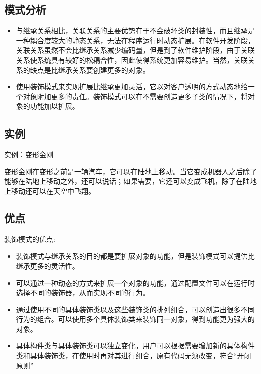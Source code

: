 \documentclass[letterpaper,10pt,english]{sphinxmanual}
\begin{document}
\subsection{模式分析}
\label{\detokenize{structural_patterns/decorator:id8}}\begin{itemize}
\item {} 
\sphinxAtStartPar
与继承关系相比，关联关系的主要优势在于不会破坏类的封装性，而且继承是一种耦合度较大的静态关系，无法在程序运行时动态扩展。在软件开发阶段，关联关系虽然不会比继承关系减少编码量，但是到了软件维护阶段，由于关联关系使系统具有较好的松耦合性，因此使得系统更加容易维护。当然，关联关系的缺点是比继承关系要创建更多的对象。

\item {} 
\sphinxAtStartPar
使用装饰模式来实现扩展比继承更加灵活，它以对客户透明的方式动态地给一个对象附加更多的责任。装饰模式可以在不需要创造更多子类的情况下，将对象的功能加以扩展。

\end{itemize}


\subsection{实例}
\label{\detokenize{structural_patterns/decorator:id9}}
\sphinxAtStartPar
实例：变形金刚

\sphinxAtStartPar
变形金刚在变形之前是一辆汽车，它可以在陆地上移动。当它变成机器人之后除了能够在陆地上移动之外，还可以说话；如果需要，它还可以变成飞机，除了在陆地上移动还可以在天空中飞翔。

\noindent{}

\noindent{}


\subsection{优点}
\label{\detokenize{structural_patterns/decorator:id10}}
\sphinxAtStartPar
装饰模式的优点:
\begin{itemize}
\item {} 
\sphinxAtStartPar
装饰模式与继承关系的目的都是要扩展对象的功能，但是装饰模式可以提供比继承更多的灵活性。

\item {} 
\sphinxAtStartPar
可以通过一种动态的方式来扩展一个对象的功能，通过配置文件可以在运行时选择不同的装饰器，从而实现不同的行为。

\item {} 
\sphinxAtStartPar
通过使用不同的具体装饰类以及这些装饰类的排列组合，可以创造出很多不同行为的组合。可以使用多个具体装饰类来装饰同一对象，得到功能更为强大的对象。

\item {} 
\sphinxAtStartPar
具体构件类与具体装饰类可以独立变化，用户可以根据需要增加新的具体构件类和具体装饰类，在使用时再对其进行组合，原有代码无须改变，符合“开闭原则”

\end{itemize}
\end{document}
